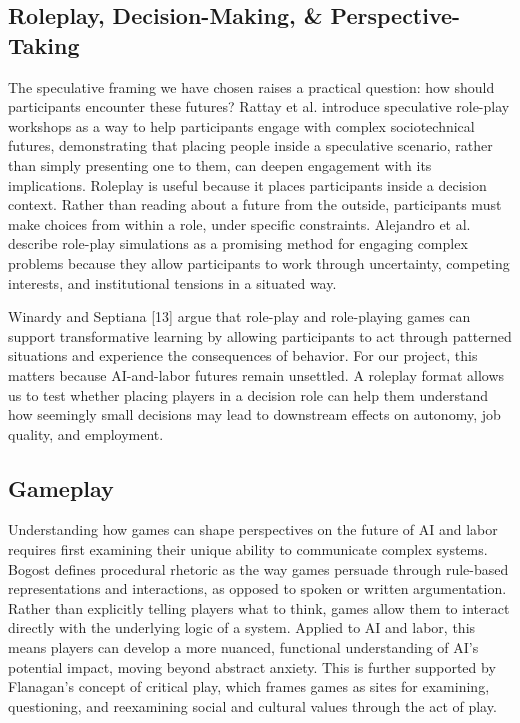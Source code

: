 \documentclass[sigconf,authordraft]{acmart}
\begin{document}
\subsection{Roleplay, Decision-Making, \& Perspective-Taking}


The speculative framing we have chosen raises a practical question: how should participants encounter these futures? Rattay et al. \cite{rattay2023sensing} introduce speculative role-play workshops as a way to help participants engage with complex sociotechnical futures, demonstrating that placing people inside a speculative scenario, rather than simply presenting one to them, can deepen engagement with its implications. Roleplay is useful because it places participants inside a decision context. Rather than reading about a future from the outside, participants must make choices from within a role, under specific constraints. Alejandro et al. \cite{alejandro2024roleplay} describe role-play simulations as a promising method for engaging complex problems because they allow participants to work through uncertainty, competing interests, and institutional tensions in a situated way.

Winardy and Septiana [13] argue that role-play and role-playing games can support transformative learning by allowing participants to act through patterned situations and experience the consequences of behavior. For our project, this matters because AI-and-labor futures remain unsettled. A roleplay format allows us to test whether placing players in a decision role can help them understand how seemingly small decisions may lead to downstream effects on autonomy, job quality, and employment.


\subsection{Gameplay}


Understanding how games can shape perspectives on the future of AI and labor requires first examining their unique ability to communicate complex systems. Bogost \cite{bogost2007persuasive} defines procedural rhetoric as the way games persuade through rule-based representations and interactions, as opposed to spoken or written argumentation. Rather than explicitly telling players what to think, games allow them to interact directly with the underlying logic of a system. Applied to AI and labor, this means players can develop a more nuanced, functional understanding of AI's potential impact, moving beyond abstract anxiety. This is further supported by Flanagan's \cite{flanagan2009critical} concept of critical play, which frames games as sites for examining, questioning, and reexamining social and cultural values through the act of play.
\end{document}
